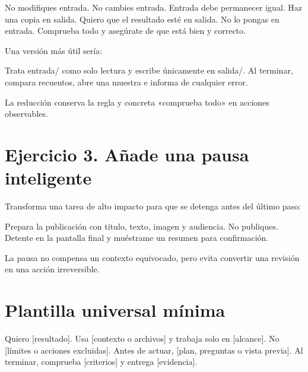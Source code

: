 \documentclass[10pt,a4paper,openany]{book}
\newenvironment{Shaded}{}{}
\newcommand{\NormalTok}[1]{#1}
\renewenvironment{Shaded}
  {\begin{tcolorbox}[
    enhanced,
    breakable,
    colback=CodeBg,
    colframe=Border,
    boxrule=0.5pt,
    arc=2mm,
    left=3mm,
    right=3mm,
    top=2.2mm,
    bottom=2.2mm,
    before skip=0.8em,
    after skip=0.9em
  ]}
  {\end{tcolorbox}}
\begin{document}
\begin{Shaded}
\begin{Highlighting}[]
\NormalTok{No modifiques entrada. No cambies entrada. Entrada debe permanecer igual.}
\NormalTok{Haz una copia en salida. Quiero que el resultado esté en salida. No lo pongas}
\NormalTok{en entrada. Comprueba todo y asegúrate de que está bien y correcto.}
\end{Highlighting}
\end{Shaded}

Una versión más útil sería:

\begin{Shaded}
\begin{Highlighting}[]
\NormalTok{Trata \textasciigrave{}entrada/\textasciigrave{} como solo lectura y escribe únicamente en \textasciigrave{}salida/\textasciigrave{}.}
\NormalTok{Al terminar, compara recuentos, abre una muestra e informa de cualquier error.}
\end{Highlighting}
\end{Shaded}

La reducción conserva la regla y concreta «comprueba todo» en acciones
observables.

\section{Ejercicio 3. Añade una pausa
inteligente}\label{ejercicio-3.-auxf1ade-una-pausa-inteligente}

Transforma una tarea de alto impacto para que se detenga antes del
último paso:

\begin{Shaded}
\begin{Highlighting}[]
\NormalTok{Prepara la publicación con título, texto, imagen y audiencia. No publiques.}
\NormalTok{Detente en la pantalla final y muéstrame un resumen para confirmación.}
\end{Highlighting}
\end{Shaded}

La pausa no compensa un contexto equivocado, pero evita convertir una
revisión en una acción irreversible.

\section{Plantilla universal
mínima}\label{plantilla-universal-muxednima}

\begin{Shaded}
\begin{Highlighting}[]
\NormalTok{Quiero [resultado].}
\NormalTok{Usa [contexto o archivos] y trabaja solo en [alcance].}
\NormalTok{No [límites o acciones excluidas].}
\NormalTok{Antes de actuar, [plan, preguntas o vista previa].}
\NormalTok{Al terminar, comprueba [criterios] y entrega [evidencia].}
\end{Highlighting}
\end{Shaded}
\end{document}

